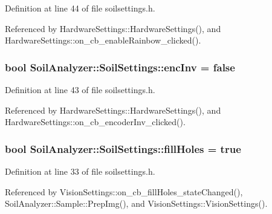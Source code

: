 Definition at line 44 of file soilsettings.\+h.



Referenced by Hardware\+Settings\+::\+Hardware\+Settings(), and Hardware\+Settings\+::on\+\_\+cb\+\_\+enable\+Rainbow\+\_\+clicked().

\hypertarget{class_soil_analyzer_1_1_soil_settings_ad831e13b61fc2097219bbf7252f045d5}{}
\subsubsection[{enc\+Inv}]{\setlength{\rightskip}{0pt plus 5cm}bool Soil\+Analyzer\+::\+Soil\+Settings\+::enc\+Inv = false}\label{class_soil_analyzer_1_1_soil_settings_ad831e13b61fc2097219bbf7252f045d5}


Definition at line 43 of file soilsettings.\+h.



Referenced by Hardware\+Settings\+::\+Hardware\+Settings(), and Hardware\+Settings\+::on\+\_\+cb\+\_\+encoder\+Inv\+\_\+clicked().

\hypertarget{class_soil_analyzer_1_1_soil_settings_a2c9dbe9429742aed1da9d9683da5cc1e}{}
\subsubsection[{fill\+Holes}]{\setlength{\rightskip}{0pt plus 5cm}bool Soil\+Analyzer\+::\+Soil\+Settings\+::fill\+Holes = true}\label{class_soil_analyzer_1_1_soil_settings_a2c9dbe9429742aed1da9d9683da5cc1e}


Definition at line 33 of file soilsettings.\+h.



Referenced by Vision\+Settings\+::on\+\_\+cb\+\_\+fill\+Holes\+\_\+state\+Changed(), Soil\+Analyzer\+::\+Sample\+::\+Prep\+Img(), and Vision\+Settings\+::\+Vision\+Settings().

\hypertarget{class_soil_analyzer_1_1_soil_settings_ad9d5071bbf6d10638df024e883c6199f}{}
